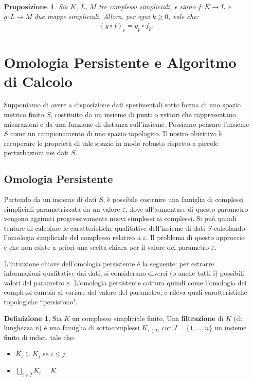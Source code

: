 \documentclass[a4paper, 12pt]{article}
\newtheorem{proposition}[theorem]{Proposizione}
\theoremstyle{definition}
\newtheorem{definition}{Definizione}[section]
\theoremstyle{remark}
\begin{document}
\begin{proposition} \label{prop:funtorialita}
    Sia $K$, $L$, $M$ tre complessi simpliciali, e siano $f : K \to L$ e $g : L \to M$ due mappe simpliciali. Allora, per ogni $k \geq 0$, vale che:
    \begin{align*}
        (g \circ f)_p = g_p \circ f_p.
    \end{align*}
\end{proposition}

\section{Omologia Persistente e Algoritmo di Calcolo}
Supponiamo di avere a disposizione dati sperimentali sotto forma di uno spazio metrico finito $S$, costituito da un insieme di punti o vettori che rappresentano misurazioni e da una funzione di distanza sull'insieme. Possiamo pensare l'insieme $S$ come un campionamento di uno spazio topologico. Il nostro obiettivo è recuperare le proprietà di tale spazio in modo robusto rispetto a piccole perturbazioni nei dati $S$.

\subsection{Omologia Persistente}
Partendo da un insieme di dati $S$, è possibile costruire una famiglia di complessi simpliciali parametrizzata da un valore $\varepsilon$, dove all'aumentare di questo parametro vengono aggiunti progressivamente nuovi simplessi ai complessi. Si può quindi tentare di calcolare le caratteristiche qualitative dell'insieme di dati $S$  calcolando l'omologia simpliciale del complesso relativo a $\varepsilon$. Il problema di questo approccio è che non esiste a priori una scelta chiara per il valore del parametro $\varepsilon$.

L'intuizione chiave dell'omologia persistente è la seguente: per estrarre informazioni qualitative dai dati, si considerano diversi (o anche tutti i) possibili valori del parametro $\varepsilon$. L'omologia persistente cattura quindi come l'omologia dei complessi cambia al variare del valore del parametro, e rileva quali caratteristiche topologiche ``persistono".

\begin{definition}
    Sia $K$ un complesso simpliciale finito. Una \textbf{filtrazione} di $K$ (di lunghezza n) è una famiglia di sottocomplessi $K_{i \in I}$, con $I = \{1,\ldots,n\}$ un insieme finito di indici, tale che:
    \begin{itemize}
        \item $K_i \subseteq K_j$ se $i \leq j$;
        \item $\displaystyle \bigcup_{i \in I} K_i = K$.
    \end{itemize}
\end{definition}
\end{document}
